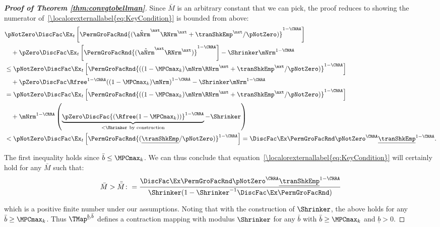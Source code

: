 \documentclass[\econtexRoot/BufferStockTheory]{subfiles}
\begin{document}
\begin{proof}[\textbf{Proof of Theorem \ref{thm:convgtobellman}}]
Since $\bar{M}$ is an arbitrary constant that we can pick, the proof reduces to showing the numerator of~\eqref{\localorexternallabel{eq:KeyCondition}} is bounded from above:
%
%
\begin{equation}
\begin{aligned}
      &\pNotZero\DiscFac\Ex_{t}\left[\PermGroFacRnd{(\hat{\aNrm}^{\nxt}\RNrm^{\nxt}+\tranShkEmp^{\nxt}/\pNotZero)}^{1-\CRRA}\right] \\
      &\quad +\pZero\DiscFac\Ex_{t}\left[\PermGroFacRnd{(\hat{\aNrm}^{\nxt}\RNrm^{\nxt})}^{1-\CRRA}\right]-\Shrinker\mNrm^{1-\CRRA} \\
      &\leq \pNotZero\DiscFac\Ex_{t}\left[\PermGroFacRnd{((1-\MPCmax_{k})\mNrm\RNrm^{\nxt}+\tranShkEmp^{\nxt}/\pNotZero)}^{1-\CRRA}\right] \\
      &\quad +\pZero\DiscFac\Rfree^{1-\CRRA}{((1-\MPCmax_{k})\mNrm)}^{1-\CRRA}- \Shrinker\mNrm^{1-\CRRA} \\
      &= \pNotZero\DiscFac\Ex_{t}\left[\PermGroFacRnd{((1-\MPCmax_{k})\mNrm\RNrm^{\nxt}+\tranShkEmp^{\nxt}/\pNotZero)}^{1-\CRRA}\right] \\
      &\quad +\mNrm^{1-\CRRA}\left(\underbrace{\pZero \DiscFac {(\Rfree (1-\MPCmax_{k}))}^{1-\CRRA}}_{<\Shrinker ~\text{by construction}}-\Shrinker \right) \\
      &< \pNotZero\DiscFac\Ex_{t}\left[\PermGroFacRnd{(\underline{\tranShkEmp}/\pNotZero)}^{1-\CRRA}\right]=\DiscFac\Ex \PermGroFacRnd\pNotZero^{\CRRA}\underline{\tranShkEmp}^{1-\CRRA} .
\end{aligned}
\end{equation}
    
%
%

The first inequality holds since $\bar{b}\leq \MPCmax_{k}$. We can thus conclude that equation~\eqref{\localorexternallabel{eq:KeyCondition}} will certainly hold for any $\bar{M}$ such that:
\begin{equation}\begin{gathered}\begin{aligned}
      \bar{M}>\bar{\bar{M}}\colon =\frac{\DiscFac \Ex \PermGroFacRnd\pNotZero^{\CRRA}\underline{\tranShkEmp}^{1-\CRRA}}{\Shrinker(1- \Shrinker^{-1}\DiscFac \Ex \PermGroFacRnd)}
    \end{aligned}\end{gathered}\end{equation}
    
which is a positive finite number under our assumptions. Noting that with the construction of $\Shrinker$, the above holds for any $\bar{b}\geq \MPCmax_{k}$. Thus $\TMap^{\underline{b}, \bar{b}}$ defines a contraction mapping with modulus $\Shrinker$ for any $\bar{b}$ with  $\bar{b}\geq \MPCmax_{k}$ and $\underline{b}>0$. 
\end{proof}
\end{document}
